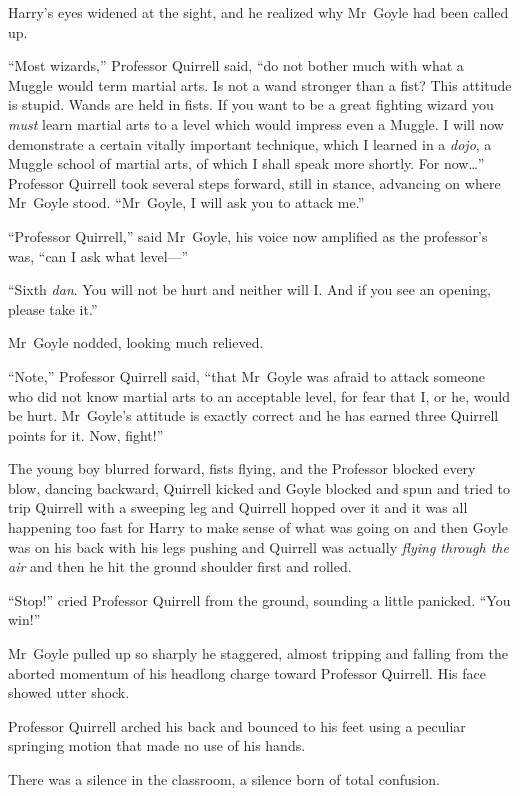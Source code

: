 Harry’s eyes widened at the sight, and he realized why Mr~Goyle had been called up.

“Most wizards,” Professor Quirrell said, “do not bother much with what a Muggle would term martial arts. Is not a wand stronger than a fist? This attitude is stupid. Wands are held in fists. If you want to be a great fighting wizard you \emph{must} learn martial arts to a level which would impress even a Muggle. I will now demonstrate a certain vitally important technique, which I learned in a \emph{dojo}, a Muggle school of martial arts, of which I shall speak more shortly. For now…” Professor Quirrell took several steps forward, still in stance, advancing on where Mr~Goyle stood. “Mr~Goyle, I will ask you to attack me.”

“Professor Quirrell,” said Mr~Goyle, his voice now amplified as the professor’s was, “can I ask what level—”

“Sixth \emph{dan}. You will not be hurt and neither will I\@. And if you see an opening, please take it.”

Mr~Goyle nodded, looking much relieved.

“Note,” Professor Quirrell said, “that Mr~Goyle was afraid to attack someone who did not know martial arts to an acceptable level, for fear that I, or he, would be hurt. Mr~Goyle’s attitude is exactly correct and he has earned three Quirrell points for it. Now, fight!”

The young boy blurred forward, fists flying, and the Professor blocked every blow, dancing backward, Quirrell kicked and Goyle blocked and spun and tried to trip Quirrell with a sweeping leg and Quirrell hopped over it and it was all happening too fast for Harry to make sense of what was going on and then Goyle was on his back with his legs pushing and Quirrell was actually \emph{flying through the air} and then he hit the ground shoulder first and rolled.

“Stop!” cried Professor Quirrell from the ground, sounding a little panicked. “You win!”

Mr~Goyle pulled up so sharply he staggered, almost tripping and falling from the aborted momentum of his headlong charge toward Professor Quirrell. His face showed utter shock.

Professor Quirrell arched his back and bounced to his feet using a peculiar springing motion that made no use of his hands.

There was a silence in the classroom, a silence born of total confusion.

